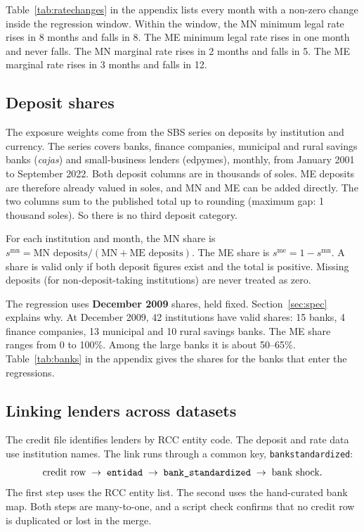 \documentclass[11pt]{article}
\newcommand{\code}[1]{\texttt{#1}}
\renewcommand{\_}{\origunderscore\hspace{0pt}}  %
\newcommand{\MN}{\mathrm{mn}}
\newcommand{\ME}{\mathrm{me}}
\begin{document}
Table~\ref{tab:ratechanges} in the appendix lists every month with a non-zero change inside the regression window.
Within the window, the MN minimum legal rate rises in 8 months and falls in 8.
The ME minimum legal rate rises in one month and never falls.
The MN marginal rate rises in 2 months and falls in 5.
The ME marginal rate rises in 3 months and falls in 12.

\subsection{Deposit shares}

The exposure weights come from the SBS series on deposits by institution and currency.
The series covers banks, finance companies, municipal and rural savings banks (\textit{cajas}) and small-business lenders (edpymes), monthly, from January 2001 to September 2022.
Both deposit columns are in thousands of soles.
ME deposits are therefore already valued in soles, and MN and ME can be added directly.
The two columns sum to the published total up to rounding (maximum gap: 1 thousand soles).
So there is no third deposit category.

For each institution and month, the MN share is $s^{\MN} = \text{MN deposits}/(\text{MN}+\text{ME deposits})$.
The ME share is $s^{\ME}=1-s^{\MN}$.
A share is valid only if both deposit figures exist and the total is positive.
Missing deposits (for non-deposit-taking institutions) are never treated as zero.

The regression uses \textbf{December 2009} shares, held fixed.
Section~\ref{sec:spec} explains why.
At December 2009, 42 institutions have valid shares: 15 banks, 4 finance companies, 13 municipal and 10 rural savings banks.
The ME share ranges from 0 to 100\%.
Among the large banks it is about 50--65\%.
Table~\ref{tab:banks} in the appendix gives the shares for the banks that enter the regressions.

\subsection{Linking lenders across datasets}

The credit file identifies lenders by RCC entity code.
The deposit and rate data use institution names.
The link runs through a common key, \code{bank\_standardized}:
\begin{equation*}
\text{credit row} \;\rightarrow\; \code{entidad} \;\rightarrow\; \code{bank\_standardized} \;\rightarrow\; \text{bank shock}.
\end{equation*}
The first step uses the RCC entity list.
The second uses the hand-curated bank map.
Both steps are many-to-one, and a script check confirms that no credit row is duplicated or lost in the merge.
\end{document}
